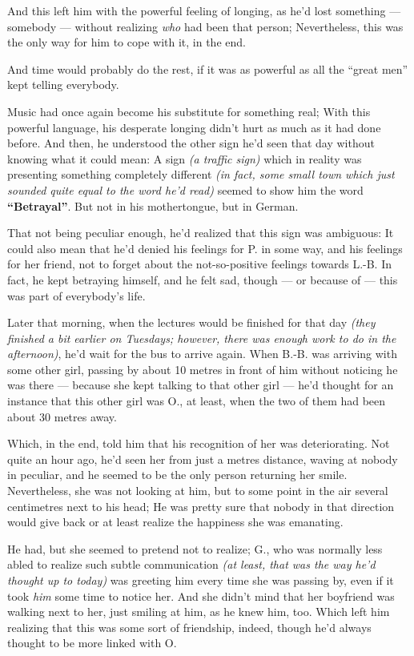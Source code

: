 And this left him with the powerful feeling of longing, as he'd lost something --- somebody --- without realizing \emph{who} had been that person; Nevertheless, this was the only way for him to cope with it, in the end.

And time would probably do the rest, if it was as powerful as all the \enquote{great men} kept telling everybody.

Music had once again become his substitute for something real; With this powerful language, his desperate longing didn't hurt as much as it had done before. And then, he understood the other sign he'd seen that day without knowing what it could mean: A sign \emph{(a traffic sign)} which in reality was presenting something completely different \emph{(in fact, some small town which just sounded quite equal to the word he'd read)} seemed to show him the word \textbf{\enquote{Betrayal}}.
But not in his mothertongue, but in German.

That not being peculiar enough, he'd realized that this sign was ambiguous: It could also mean that he'd denied his feelings for P. in some way, and his feelings for her friend, not to forget about the not-so-positive feelings towards L.-B. In fact, he kept betraying himself, and he felt sad, though --- or because of --- this was part of everybody's life.

Later that morning, when the lectures would be finished for that day \emph{(they finished a bit earlier on Tuesdays; however, there was enough work to do in the afternoon)}, he'd wait for the bus to arrive again. When B.-B. was arriving with some other girl, passing by about 10 metres in front of him without noticing he was there --- because she kept talking to that other girl --- he'd thought for an instance that this other girl was O., at least, when the two of them had been about 30 metres away.

Which, in the end, told him that his recognition of her was deteriorating. Not quite an hour ago, he'd seen her from just a metres distance, waving at nobody in peculiar, and he seemed to be the only person returning her smile. Nevertheless, she was not looking at him, but to some point in the air several centimetres next to his head; He was pretty sure that nobody in that direction would give back or at least realize the happiness she was emanating.

He had, but she seemed to pretend not to realize; G., who was normally less abled to realize such subtle communication \emph{(at least, that was the way he'd thought up to today)} was greeting him every time she was passing by, even if it took \emph{him} some time to notice her. And she didn't mind that her boyfriend was walking next to her, just smiling at him, as he knew him, too. 
Which left him realizing that this was some sort of friendship, indeed, though he'd always thought to be more linked with O.

